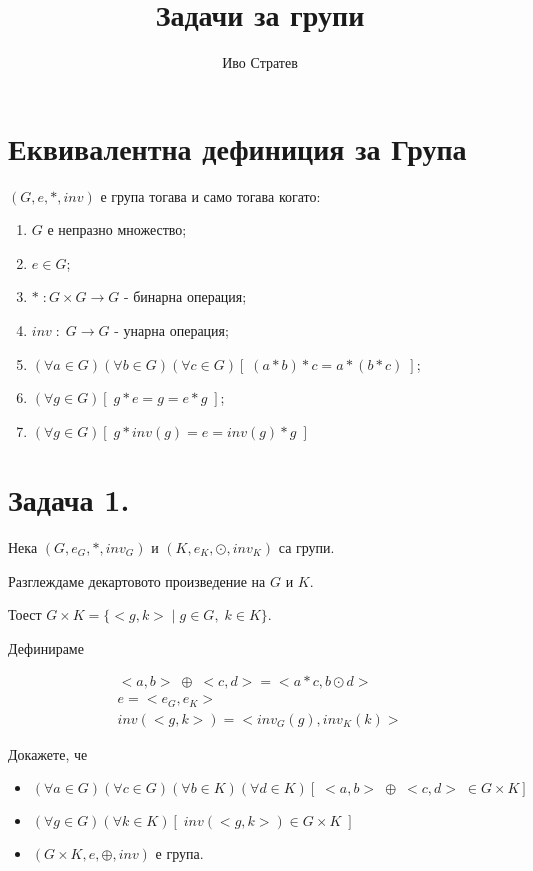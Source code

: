 \documentclass{article}[12pt]
\title{Задачи за групи}
\author{Иво Стратев}
\begin{document}
\maketitle

\section*{Еквивалентна дефиниция за Група}

\((G, e, *, inv)\) е група тогава и само тогава когато:

\begin{enumerate}
\item \(G\) е непразно множество;
\item \(e \in G\);
\item \(* \; : G \times G \to G\) - бинарна операция;
\item \(inv \; : \; G \to G\) - унарна операция;
\item \((\forall a \in G)(\forall b \in G)(\forall c \in G)[\; (a * b) * c = a * (b * c) \;]\);
\item \((\forall g \in G)[\; g * e = g = e * g \;]\);
\item \((\forall g \in G)[\; g * inv(g) = e = inv(g) * g \;]\)
\end{enumerate}

\section*{Задача 1.}

Нека \((G, e_G, *, inv_G)\) и \((K, e_K, \odot, inv_K)\) са групи.

Разглеждаме декартовото произведение на \(G\) и \(K\).

Тоест \(G \times K = \{<g, k> \; | \; g \in G, \; k \in K\}\).

Дефинираме 

\begin{align*}
<a, b> \; \oplus \; <c, d> = <a * c, b \odot d> \\
e = <e_G, e_K> \\
inv(<g, k>) = <inv_G(g), inv_K(k)>
\end{align*}

Докажете, че 

\begin{itemize}
\item \((\forall a \in G)(\forall c \in G)(\forall b \in K)(\forall d \in K)[\; <a, b> \; \oplus \; <c, d> \; \in G \times K] \;\)
\item \((\forall g \in G)(\forall k \in K)[\; inv(<g, k>) \in G \times K \;]\)
\item \((G \times K, e, \oplus, inv)\) е група.
\end{itemize}
\end{document}
